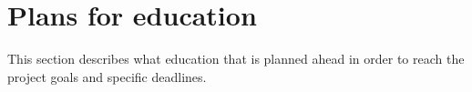 

\section{Plans for education}
This section describes what education that is planned ahead in order to reach the project goals and specific deadlines. 




